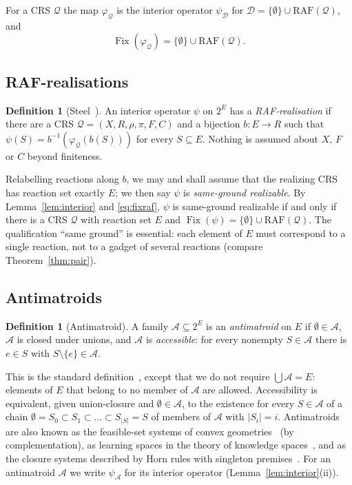 \documentclass[11pt,a4paper]{article}
\theoremstyle{plain}
\theoremstyle{definition}
\newtheorem{definition}[theorem]{Definition}
\theoremstyle{remark}
\newcommand{\Fix}{\operatorname{Fix}}
\newcommand{\RAF}{\mathrm{RAF}}
\newcommand{\cA}{\mathcal{A}}
\newcommand{\cD}{\mathcal{D}}
\newcommand{\cQ}{\mathcal{Q}}
\newcommand{\pw}[1]{2^{#1}}
\begin{document}
For a CRS $\cQ$ the map $\varphi_{\cQ}$ is the interior operator $\psi_{\cD}$ for $\cD=\{\emptyset\}\cup\RAF(\cQ)$, and
\begin{equation}\label{eq:fixraf}
\Fix(\varphi_{\cQ})=\{\emptyset\}\cup\RAF(\cQ).
\end{equation}

\subsection{RAF-realisations}

\begin{definition}[Steel~\cite{steel2023interior}]\label{def:realisation}
An interior operator $\psi$ on $\pw{E}$ has a \emph{RAF-realisation} if there are a CRS $\cQ=(X,R,\rho,\pi,F,C)$ and a bijection $b\colon E\to R$ such that $\psi(S)=b^{-1}(\varphi_{\cQ}(b(S)))$ for every $S\subseteq E$. Nothing is assumed about $X$, $F$ or $C$ beyond finiteness.
\end{definition}

Relabelling reactions along $b$, we may and shall assume that the realizing CRS has reaction set exactly $E$; we then say $\psi$ is \emph{same-ground realizable}. By Lemma~\ref{lem:interior} and \eqref{eq:fixraf}, $\psi$ is same-ground realizable if and only if there is a CRS $\cQ$ with reaction set $E$ and $\Fix(\psi)=\{\emptyset\}\cup\RAF(\cQ)$. The qualification ``same ground'' is essential: each element of $E$ must correspond to a single reaction, not to a gadget of several reactions (compare Theorem~\ref{thm:pair}).

\subsection{Antimatroids}

\begin{definition}[Antimatroid]\label{def:antimatroid}
A family $\cA\subseteq\pw{E}$ is an \emph{antimatroid} on $E$ if $\emptyset\in\cA$, $\cA$ is closed under unions, and $\cA$ is \emph{accessible}: for every nonempty $S\in\cA$ there is $e\in S$ with $S\setminus\{e\}\in\cA$.
\end{definition}

This is the standard definition~\cite{korte1991greedoids,bjorner1992greedoids}, except that we do not require $\bigcup\cA=E$: elements of $E$ that belong to no member of $\cA$ are allowed. Accessibility is equivalent, given union-closure and $\emptyset\in\cA$, to the existence for every $S\in\cA$ of a chain $\emptyset=S_0\subset S_1\subset\dots\subset S_{|S|}=S$ of members of $\cA$ with $|S_i|=i$. Antimatroids are also known as the feasible-set systems of convex geometries~\cite{edelman1985theory} (by complementation), as learning spaces in the theory of knowledge spaces~\cite{doignon1999knowledge,falmagne2011learning}, and as the closure systems described by Horn rules with singleton premises~\cite{yoshikawa2017representation,wild2017joy}. For an antimatroid $\cA$ we write $\psi_{\cA}$ for its interior operator (Lemma~\ref{lem:interior}(ii)).
\end{document}
